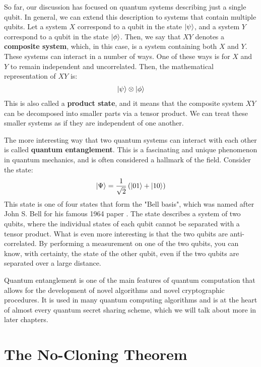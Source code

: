 So far, our discussion has focused on quantum systems describing just a single qubit. In general, we can extend this description to systems that contain multiple qubits. Let a system $X$ correspond to a qubit in the state $\ket{\psi}$, and a system $Y$ correspond to a qubit in the state $\ket{\phi}$. Then, we say that $XY$ denotes a \textbf{composite system}, which, in this case, is a system containing both $X$ and $Y$. These systems can interact in a number of ways. One of these ways is for $X$ and $Y$ to remain independent and uncorrelated. Then, the mathematical representation of $XY$ is:
\begin{align}
    \ket{\psi} \otimes \ket{\phi}
\end{align}
This is also called a \textbf{product state}, and it means that the composite system $XY$ can be decomposed into smaller parts via a tensor product. We can treat these smaller systems as if they are independent of one another.

The more interesting way that two quantum systems can interact with each other is called \textbf{quantum entanglement}. This is a fascinating and unique phenomenon in quantum mechanics, and is often considered a hallmark of the field. Consider the state:
\begin{align*}
    \ket{\Psi} &= \frac{1}{\sqrt{2}}\left( \ket{01} + \ket{10} \right) \\ 
\end{align*}
This state is one of four states that form the "Bell basis", which was named after John S. Bell for his famous 1964 paper \cite{bell1964einstein}. The state describes a system of two qubits, where the individual states of each qubit cannot be separated with a tensor product. What is even more interesting is that the two qubits are anti-correlated. By performing a measurement on one of the two qubits, you can know, with certainty, the state of the other qubit, even if the two qubits are separated over a large distance.

Quantum entanglement is one of the main features of quantum computation that allows for the development of novel algorithms and novel cryptographic procedures. It is used in many quantum computing algorithms and is at the heart of almost every quantum secret sharing scheme, which we will talk about more in later chapters.

\section{The No-Cloning Theorem}

